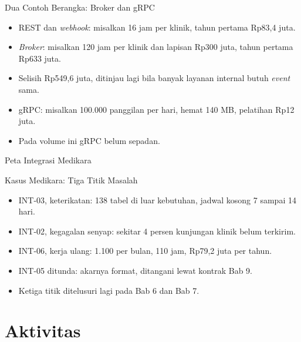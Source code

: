 \documentclass[aspectratio=169, table, 12pt]{beamer}
\begin{document}
\begin{frame}{{\Large Dua Contoh Berangka: Broker dan gRPC}}
  \vspace{10pt}
  \begin{itemize}
    \item REST dan \textit{webhook}: misalkan 16 jam per klinik, tahun pertama Rp83,4 juta.
    \item \textit{Broker}: misalkan 120 jam per klinik dan lapisan Rp300 juta, tahun pertama Rp633 juta.
    \item Selisih Rp549,6 juta, ditinjau lagi bila banyak layanan internal butuh \textit{event} sama.
    \item gRPC: misalkan 100.000 panggilan per hari, hemat 140 MB, pelatihan Rp12 juta.
    \item Pada volume ini gRPC belum sepadan.
  \end{itemize}
\end{frame}

\begin{frame}{{\Large Peta Integrasi Medikara}}
  \centering
  \resizebox{!}{0.8\textheight}{}
\end{frame}

\begin{frame}{{\Large Kasus Medikara: Tiga Titik Masalah}}
  \vspace{10pt}
  \begin{itemize}
    \item INT-03, keterikatan: 138 tabel di luar kebutuhan, jadwal kosong 7 sampai 14 hari.
    \item INT-02, kegagalan senyap: sekitar 4 persen kunjungan klinik belum terkirim.
    \item INT-06, kerja ulang: 1.100 per bulan, 110 jam, Rp79,2 juta per tahun.
    \item INT-05 ditunda: akarnya format, ditangani lewat kontrak Bab 9.
    \item Ketiga titik ditelusuri lagi pada Bab 6 dan Bab 7.
  \end{itemize}
\end{frame}

\section{Aktivitas}
\end{document}
